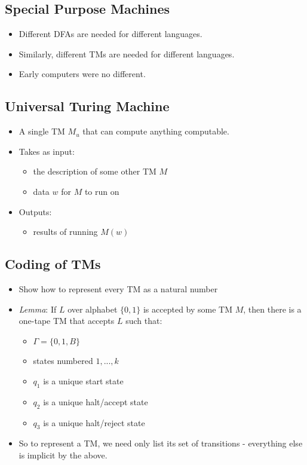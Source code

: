 \subsection{Special Purpose Machines}
\begin{itemize}
    \item Different DFAs are needed for different languages.
    \item Similarly, different TMs are needed for different languages.
    \item Early computers were no different.
\end{itemize}

\subsection{Universal Turing Machine}
\begin{itemize}
    \item A single TM $M_u$ that can compute anything computable.
    \item Takes as input:
    \begin{itemize}
        \item the description of some other TM $M$
        \item data $w$ for $M$ to run on
    \end{itemize}
    \item Outputs:
    \begin{itemize}
        \item results of running $M(w)$
    \end{itemize}
\end{itemize}

\subsection{Coding of TMs}
\begin{itemize}
    \item Show how to represent every TM as a natural number
    \item \textit{Lemma}: If $L$ over alphabet $\{ 0, 1 \}$ is accepted by some TM $M$, then there is a one-tape TM that accepts $L$ such that:
    \begin{itemize}
        \item $\Gamma = \{ 0, 1, B \}$
        \item states numbered $1, ..., k$
        \item $q_1$ is a unique start state
        \item $q_2$ is a unique halt/accept state
        \item $q_3$ is a unique halt/reject state
    \end{itemize}
    \item So to represent a TM, we need only list its set of transitions - everything else is implicit by the above.
\end{itemize}

